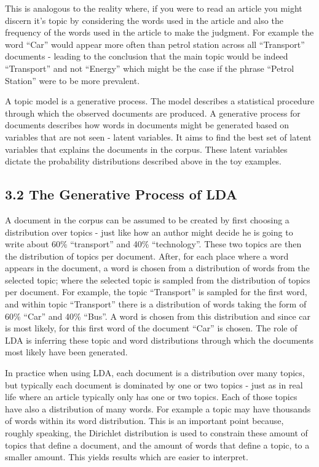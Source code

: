 \documentclass[
]{article}
\begin{document}
This is analogous to the reality where, if you were to read an article
you might discern it's topic by considering the words used in the
article and also the frequency of the words used in the article to make
the judgment. For example the word ``Car'' would appear more often than
petrol station across all ``Transport'' documents - leading to the
conclusion that the main topic would be indeed ``Transport'' and not
``Energy'' which might be the case if the phrase ``Petrol Station'' were
to be more prevalent.

A topic model is a generative process. The model describes a statistical
procedure through which the observed documents are produced. A
generative process for documents describes how words in documents might
be generated based on variables that are not seen - latent variables. It
aims to find the best set of latent variables that explains the
documents in the corpus. These latent variables dictate the probability
distributions described above in the toy examples.

\hypertarget{the-generative-process-of-lda}{%
\subsection{3.2 The Generative Process of
LDA}\label{the-generative-process-of-lda}}

A document in the corpus can be assumed to be created by first choosing
a distribution over topics - just like how an author might decide he is
going to write about 60\% ``transport'' and 40\% ``technology''. These
two topics are then the distribution of topics per document. After, for
each place where a word appears in the document, a word is chosen from a
distribution of words from the selected topic; where the selected topic
is sampled from the distribution of topics per document. For example,
the topic ``Transport'' is sampled for the first word, and within topic
``Transport'' there is a distribution of words taking the form of 60\%
``Car'' and 40\% ``Bus''. A word is chosen from this distribution and
since car is most likely, for this first word of the document ``Car'' is
chosen. The role of LDA is inferring these topic and word distributions
through which the documents most likely have been generated.

In practice when using LDA, each document is a distribution over many
topics, but typically each document is dominated by one or two topics -
just as in real life where an article typically only has one or two
topics. Each of those topics have also a distribution of many words. For
example a topic may have thousands of words within its word
distribution. This is an important point because, roughly speaking, the
Dirichlet distribution is used to constrain these amount of topics that
define a document, and the amount of words that define a topic, to a
smaller amount. This yields results which are easier to interpret.
\end{document}
